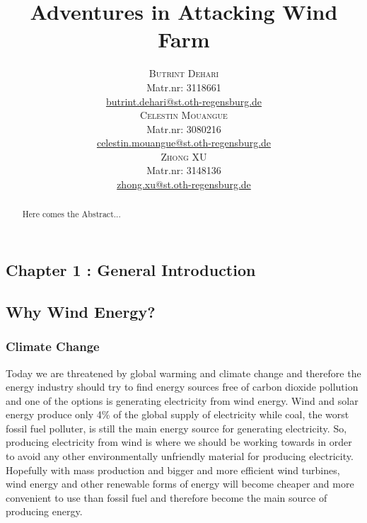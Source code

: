 \documentclass[twosided,a4,10pt]{article}
\title{\vspace{-5mm}%
	\fontsize{20pt}{10pt}\selectfont
	\textbf{Adventures in Attacking Wind Farm}
	}
\author{
	\large
       \begin{minipage}[t]{0.33\linewidth}
         \begin{center}
           	\textsc{Butrint Dehari}\\[2mm]
                 \normalsize	Matr.nr: 3118661\\
                 \normalsize
                 \href{mailto:autor1@stud.oth-regensburg.de}
                 {butrint.dehari@st.oth-regensburg.de}      
         \end{center}
       \end{minipage}        
       \begin{minipage}[t]{0.33\linewidth}
         \begin{center}
           	\textsc{Celestin Mouangue}\\[2mm]
                 \normalsize	Matr.nr: 3080216\\
                 \normalsize
                 \href{mailto:autor2@stud.oth-regensburg.de}
                 {celestin.mouangue@st.oth-regensburg.de}      
         \end{center}
       \end{minipage}
       \begin{minipage}[t]{0.33\linewidth}
         \begin{center}
           	\textsc{Zhong XU}\\[2mm]
                 \normalsize	Matr.nr: 3148136\\
                 \normalsize
                 \href{mailto:autor3@stud.oth-regensburg.de}
                 {zhong.xu@st.oth-regensburg.de}      
         \end{center}
       \end{minipage}
     }
\begin{document}
\tableofcontents

\maketitle
\thispagestyle{fancy}

\begin{abstract}
\noindent Here comes the Abstract...
\end{abstract}
	

\begin{multicols}{2}


\section{Chapter 1 : General Introduction}

 \subsection{Why Wind Energy?}
 \subsubsection{Climate Change}
 Today we are threatened by global warming and climate change and therefore the energy industry should try to find energy sources free of carbon dioxide pollution and one of the options is generating electricity from wind energy. Wind and solar energy produce only 4\% of the global supply of electricity while coal, the worst fossil fuel polluter, is still the main energy source for generating electricity. So, producing electricity from wind is where we should be working towards in order to avoid any other environmentally unfriendly material for producing electricity. Hopefully with mass production and bigger and more efficient wind turbines, wind energy and other renewable forms of energy will become cheaper and more convenient to use than fossil fuel and therefore become the main source of producing energy.

\end{multicols}
\end{document}
